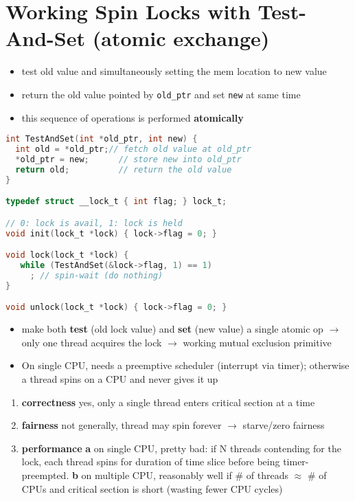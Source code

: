 \section*{Working Spin Locks with Test-And-Set (atomic exchange)}
\begin{itemize}
\item test old value and simultaneously setting the mem location to new value
\item return the old value pointed by \texttt{old\_ptr} and set \texttt{new} at same time
\item this sequence of operations is performed \textbf{atomically}
\end{itemize}
\begin{minipage}{.7\linewidth}
\begin{lstlisting}[language=c]
int TestAndSet(int *old_ptr, int new) {
  int old = *old_ptr;// fetch old value at old_ptr
  *old_ptr = new;      // store new into old_ptr
  return old;          // return the old value
}

typedef struct __lock_t { int flag; } lock_t;

// 0: lock is avail, 1: lock is held
void init(lock_t *lock) { lock->flag = 0; }

void lock(lock_t *lock) {
   while (TestAndSet(&lock->flag, 1) == 1)
     ; // spin-wait (do nothing)
}

void unlock(lock_t *lock) { lock->flag = 0; }
\end{lstlisting}
\end{minipage}
\begin{minipage}{.3\linewidth}
  \flushleft
  \begin{itemize}
  \item make both \textbf{test} (old lock value) and \textbf{set} (new value) a single atomic op $\to$ only one thread acquires the lock $\to$ working mutual exclusion primitive
  \item On single CPU, needs a preemptive scheduler (interrupt via timer); otherwise a thread spins on a CPU and never gives it up
  \end{itemize}
\end{minipage}
\begin{enumerate}
\item \textbf{correctness} yes, only a single thread enters critical section at a time
\item \textbf{fairness} not generally, thread may spin forever $\to$ starve/zero fairness
\item \textbf{performance} \textbf{a} on single CPU, pretty bad: if N threads contending for the lock, each thread spins for duration of time slice before being timer-preempted. \textbf{b} on multiple CPU, reasonably well if \# of threads $\approx$ \# of CPUs and critical section is short (wasting fewer CPU cycles)
\end{enumerate}

